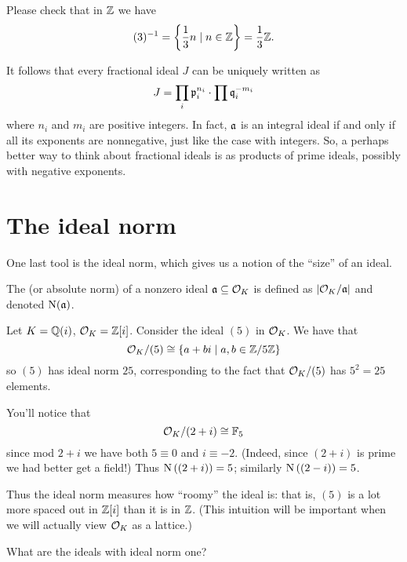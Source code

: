 \begin{example}[$(3)\inv$ in $\ZZ$]
	Please check that in $\ZZ$ we have
	\[ (3)^{-1} = \left\{ \frac 13 n \mid n \in \mathbb Z \right\} = \frac 13 \mathbb Z. \]
\end{example}

It follows that every fractional ideal $J$ can be uniquely written as
\[ J = \prod_i \mathfrak p_i^{n_i} \cdot \prod \mathfrak q_i^{-m_i} \]
where $n_i$ and $m_i$ are positive integers.
In fact, $\mathfrak a$ is an integral ideal if and only if all its exponents are nonnegative,
just like the case with integers.
So, a perhaps better way to think about fractional ideals is
as products of prime ideals, possibly with negative exponents.

\section{The ideal norm}
One last tool is the ideal norm,
which gives us a notion of the ``size'' of an ideal.
\begin{definition}
	The  (or absolute norm)
	of a nonzero ideal $\mathfrak a \subseteq \mathcal O_K$ is defined as
	$\left\lvert \mathcal O_K / \mathfrak a \right\rvert$ and denoted $\operatorname{N}(\mathfrak a)$.
\end{definition}
\begin{example}
	Let $K = \mathbb Q(i)$, $\mathcal O_K = \mathbb Z[i]$.
	Consider the ideal $(5)$ in $\mathcal O_K$.
	We have that 
	\[ \mathcal O_K / (5) \cong \{ a+bi \mid a,b \in \mathbb Z/5\mathbb Z \} \]
	so $(5)$ has ideal norm $25$,
	corresponding to the fact that $\mathcal O_K/(5)$ has $5^2=25$ elements.
\end{example}

\begin{example}
	You'll notice that \[ \mathcal O_K / (2+i) \cong \mathbb F_5 \]
	since mod $2+i$ we have both $5 \equiv 0$ and $i \equiv -2$.
	(Indeed, since $(2+i)$ is prime we had better get a field!)
	Thus $\operatorname{N}\left( (2+i) \right) = 5$; similarly $\operatorname{N}\left( (2-i) \right) = 5$.
\end{example}

Thus the ideal norm measures how ``roomy'' the ideal is:
that is, $(5)$ is a lot more spaced out in $\mathbb Z[i]$ than it is in $\ZZ$.
(This intuition will be important when we will actually view $\mathcal O_K$ as a lattice.)

\begin{ques}
	What are the ideals with ideal norm one?
\end{ques}

